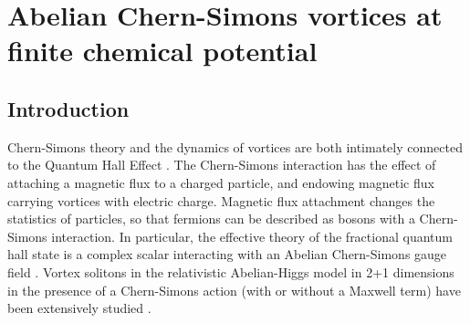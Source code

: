 \chapter{Abelian Chern-Simons vortices at finite chemical potential}
\label{ch:Chapter_2}
    \graphicspath{{Chapter_2_Folder/figures/PNG/}{Chapter_2_Folder/figures/PDF/}{Chapter_2_Folder/figures/}}


\section{Introduction}
Chern-Simons theory and the dynamics of vortices are both intimately connected to the Quantum Hall Effect \cite{Zhang:1988wy}. The Chern-Simons interaction  has the effect of attaching a magnetic flux to a charged particle, and endowing magnetic flux carrying vortices  with electric charge.  Magnetic flux attachment changes the  statistics of particles, so that fermions can be described as bosons with a Chern-Simons interaction. In particular, the effective theory of the fractional quantum hall state is a complex scalar interacting with an Abelian Chern-Simons gauge field \cite{Zhang:1988wy, Tong:2016kpv}.
Vortex solitons in the relativistic Abelian-Higgs model  in 2+1 dimensions in the presence  of a Chern-Simons action  (with or without a Maxwell term) have been extensively studied \cite{Paul:1986ix, Jackiw:1990aw, Hong:1990yh, Jackiw:1990pr, Dunne:1998qy, Horvathy:2008hd}.

